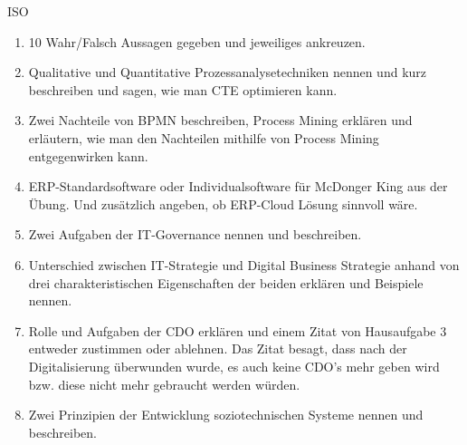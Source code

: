 \documentclass{article}
\begin{document}
\begin{exercise}{ISO}
  \begin{enumerate}
    \item 10 Wahr/Falsch Aussagen gegeben und jeweiliges ankreuzen.
    \item Qualitative und Quantitative Prozessanalysetechniken nennen und kurz beschreiben und sagen, wie man CTE optimieren kann.
    \item Zwei Nachteile von BPMN beschreiben, Process Mining erklären und erläutern, wie man den Nachteilen mithilfe von Process Mining entgegenwirken kann.
    \item ERP-Standardsoftware oder Individualsoftware für McDonger King aus der Übung. Und zusätzlich angeben, ob ERP-Cloud Lösung sinnvoll wäre.
    \item Zwei Aufgaben der IT-Governance nennen und beschreiben.
    \item Unterschied zwischen IT-Strategie und Digital Business Strategie anhand von drei charakteristischen Eigenschaften der beiden erklären und Beispiele nennen.
    \item Rolle und Aufgaben der CDO erklären und einem Zitat von Hausaufgabe 3 entweder zustimmen oder ablehnen. Das Zitat besagt, dass nach der Digitalisierung überwunden wurde, es auch keine CDO's mehr geben wird bzw. diese nicht mehr gebraucht werden würden.
    \item Zwei Prinzipien der Entwicklung soziotechnischen Systeme nennen und beschreiben.
  \end{enumerate}
\end{exercise}



\end{document}
